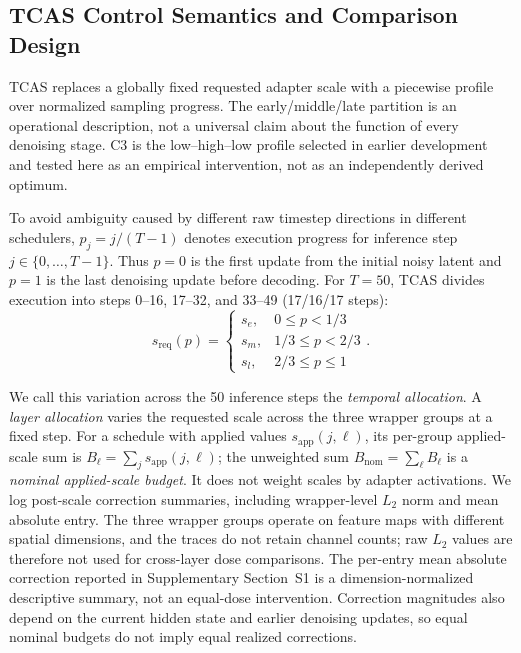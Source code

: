 \documentclass[times,twocolumn,final]{elsarticle}
\begin{document}
\subsection{TCAS Control Semantics and Comparison Design}
\label{subsec:tcas}

TCAS replaces a globally fixed requested adapter scale with a piecewise profile over normalized sampling progress. The early/middle/late partition is an operational description, not a universal claim about the function of every denoising stage. C3 is the low--high--low profile selected in earlier development and tested here as an empirical intervention, not as an independently derived optimum.

To avoid ambiguity caused by different raw timestep directions in different schedulers, $p_j=j/(T-1)$ denotes execution progress for inference step $j\in\{0,\ldots,T-1\}$. Thus $p=0$ is the first update from the initial noisy latent and $p=1$ is the last denoising update before decoding. For $T=50$, TCAS divides execution into steps 0--16, 17--32, and 33--49 (17/16/17 steps):
\begin{equation}
s_{\mathrm{req}}(p) = \begin{cases} s_e, & 0 \leq p < 1/3 \\ s_m, & 1/3 \leq p < 2/3 \\ s_l, & 2/3 \leq p \leq 1 \end{cases}.
\label{eq:tcas}
\end{equation}

We call this variation across the 50 inference steps the \emph{temporal allocation}. A \emph{layer allocation} varies the requested scale across the three wrapper groups at a fixed step. For a schedule with applied values $s_{\mathrm{app}}(j,\ell)$, its per-group applied-scale sum is $B_\ell=\sum_j s_{\mathrm{app}}(j,\ell)$; the unweighted sum $B_{\mathrm{nom}}=\sum_\ell B_\ell$ is a \emph{nominal applied-scale budget}. It does not weight scales by adapter activations. We log post-scale correction summaries, including wrapper-level $L_2$ norm and mean absolute entry. The three wrapper groups operate on feature maps with different spatial dimensions, and the traces do not retain channel counts; raw $L_2$ values are therefore not used for cross-layer dose comparisons. The per-entry mean absolute correction reported in Supplementary Section~S1 is a dimension-normalized descriptive summary, not an equal-dose intervention. Correction magnitudes also depend on the current hidden state and earlier denoising updates, so equal nominal budgets do not imply equal realized corrections.
\end{document}
